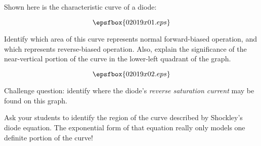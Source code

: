 

Shown here is the characteristic curve of a diode:

$$\epsfbox{02019x01.eps}$$

Identify which area of this curve represents normal forward-biased operation, and which represents reverse-biased operation.  Also, explain the significance of the near-vertical portion of the curve in the lower-left quadrant of the graph.







$$\epsfbox{02019x02.eps}$$

\vskip 10pt

Challenge question: identify where the diode's {\it reverse saturation current} may be found on this graph.







Ask your students to identify the region of the curve described by Shockley's diode equation.  The exponential form of that equation really only models one definite portion of the curve!




